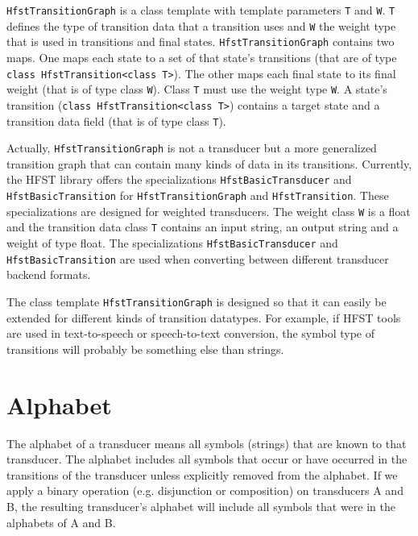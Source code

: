 \documentclass{llncs}
\begin{document}
\texttt{HfstTransitionGraph} is a class template with template parameters 
\texttt{T} and \texttt{W}. \texttt{T} defines the type of transition data
that a transition uses and \texttt{W}
the weight type that is used in transitions and final states. 
\texttt{HfstTransitionGraph} contains two maps. One maps each state to a set of
that state's transitions (that are of type 
\texttt{class HfstTransition\textless class T\textgreater}). 
The other maps each final state to its final weight 
(that is of type class \texttt{W}). Class \texttt{T} must use
the weight type \texttt{W}. 
A state's transition 
(\texttt{class HfstTransition\textless class T\textgreater}) 
contains a target state and a transition data field (that is of type class 
\texttt{T}).

Actually, \texttt{HfstTransitionGraph} is not a transducer but a more
generalized transition graph that can contain many kinds of data in
its transitions. Currently, the HFST library offers the specializations 
\texttt{HfstBasicTransducer} and \texttt{HfstBasicTransition} 
for \texttt{HfstTransitionGraph} and \texttt{HfstTransition}.
These specializations are designed for weighted 
transducers. The weight class \texttt{W} is a float and the transition data
class \texttt{T} contains an input string, an output string and a weight of
type float. The specializations \texttt{HfstBasicTransducer} and
\texttt{HfstBasicTransition} are used when converting between different
transducer backend formats.

The class template \texttt{HfstTransitionGraph} is designed so that it can
easily be extended for different kinds of transition datatypes. For
example, if HFST tools are used in text-to-speech or speech-to-text
conversion, the symbol type of transitions will probably be something
else than strings.



\section{Alphabet}

The alphabet of a transducer means all symbols (strings) that are
known to that transducer. The alphabet includes all symbols that occur 
or have occurred in the transitions of the transducer unless explicitly
removed from the alphabet. 
If we apply a binary operation (e.g. disjunction or composition) on 
transducers A and B, the resulting transducer's alphabet will include
all symbols that were in the alphabets of A and B. 
\end{document}
